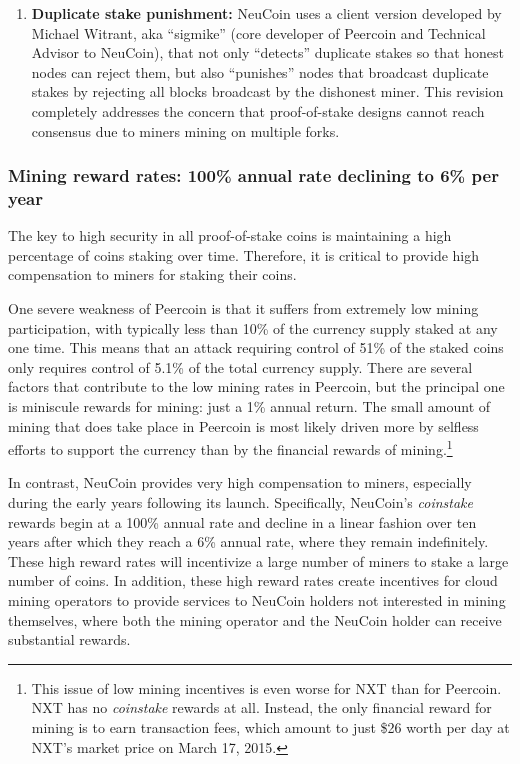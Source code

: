 \documentclass[a4paper,11pt]{article}
\begin{document}
\begin{enumerate}
\item{\textbf{Duplicate stake punishment:} NeuCoin uses a client version developed by Michael Witrant, aka ``sigmike'' (core developer of Peercoin and Technical Advisor to NeuCoin), that not only “detects” duplicate stakes so that honest nodes can reject them, but also “punishes” nodes that broadcast duplicate stakes by rejecting all blocks broadcast by the dishonest miner. This revision completely addresses the concern that proof-of-stake designs cannot reach consensus due to miners mining on multiple forks.}
\end{enumerate}

\subsubsection*{Mining reward rates: 100\% annual rate declining to 6\% per year}

The key to high security in all proof-of-stake coins is maintaining a high percentage of coins staking over time. Therefore, it is critical to provide high compensation to miners for staking their coins.

One severe weakness of Peercoin is that it suffers from extremely low mining participation, with typically less than 10\% of the currency supply staked at any one time. This means that an attack requiring control of 51\% of the staked coins only requires control of 5.1\% of the total currency supply. There are several factors that contribute to the low mining rates in Peercoin, but the principal one is miniscule rewards for mining: just a 1\% annual return. The small amount of mining that does take place in Peercoin is most likely driven more by selfless efforts to support the currency than by the financial rewards of mining.\footnote{This issue of low mining incentives is even worse for NXT than for Peercoin. NXT has no \textit{coinstake} rewards at all. Instead, the only financial reward for mining is to earn transaction fees, which amount to just \$26 worth per day at NXT's market price on March 17, 2015.}

In contrast, NeuCoin provides very high compensation to miners, especially during the early years following its launch. Specifically, NeuCoin's \textit{coinstake} rewards begin at a 100\% annual rate and decline in a linear fashion over ten years after which they reach a 6\% annual rate, where they remain indefinitely. These high reward rates will incentivize a large number of miners to stake a large number of coins. In addition, these high reward rates create incentives for cloud mining operators to provide services to NeuCoin holders not interested in mining themselves, where both the mining operator and the NeuCoin holder can receive substantial rewards. 
\end{document}

